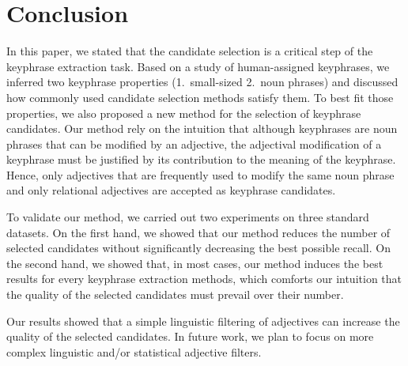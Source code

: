 \section{Conclusion}
\label{sec:conclusion}
  In this paper, we stated that the candidate selection is a critical step of
  the keyphrase extraction task. Based on a study of human-assigned keyphrases,
  we inferred two keyphrase properties (1.~small-sized 2.~noun phrases) and
  discussed how commonly used candidate selection methods satisfy them. To best
  fit those properties, we also proposed a new method for the selection of
  keyphrase candidates. Our method rely on the intuition that although
  keyphrases are noun phrases that can be modified by an adjective, the
  adjectival modification of a keyphrase must be justified by its contribution
  to the meaning of the keyphrase. Hence, only adjectives that are frequently
  used to modify the same noun phrase and only relational adjectives are
  accepted as keyphrase candidates.

  To validate our method, we carried out two experiments on three standard
  datasets. On the first hand, we showed that our method reduces the number of
  selected candidates without significantly decreasing the best possible recall.
  On the second hand, we showed that, in most cases, our method induces the best
  results for every keyphrase extraction methods, which comforts our intuition
  that the quality of the selected candidates must prevail over their number.

  Our results showed that a simple linguistic filtering of adjectives can
  increase the quality of the selected candidates. In future work, we plan to
  focus on more complex linguistic and/or statistical adjective filters.

